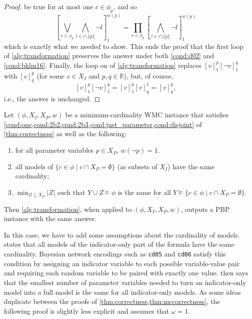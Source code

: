 \documentclass[runningheads]{llncs}
\begin{document}
\begin{proof}
   be true for at most one $c \in \phi_p$, and so
   \[
     \left[ \bigvee_{c \in \phi_p} \bigwedge_{l \in c \setminus \{ p \}} \neg l
     \right]_1^{w(p)} = \prod_{c \in \phi_p} \left[ \bigwedge_{l \in c \setminus
         \{ p \}} \neg l \right]_1^{w(p)}
   \]
   which is exactly what we needed to show. This ends the proof that the
   first loop of \cref{alg:transformation} preserves the answer under both
   \cref{cond:d02} and \cref{cond:bklm16}. Finally, the loop on
    of \cref{alg:transformation}
   replaces $[v]_1^p[\neg v]_1^q$ with $[v]_q^p$ (for some $v \in X_I$ and $p, q
   \in \mathbb{R}$), but, of course,
   \[
     [v]_1^p[\neg v]_1^q = [v]_1^p[v]_q^1 = [v]_q^p,
   \]
   i.e., the answer is unchanged.
\end{proof}

\begin{theorem} \label{thm:mccorrectness}
  Let $(\phi, X_I, X_P, w)$ be a minimum-cardinality WMC instance that satisfies
  \cref{cond:one,cond:2b2,cond:2b3,cond:just_parameter,cond:disjoint} of
  \cref{thm:correctness} as well as the following:
  \begin{enumerate}
  \item for all parameter variables $p \in X_P$, $w(\neg p) = 1$.
  \item all models of $\{ c \in \phi \mid c \cap X_P = \emptyset \}$ (as subsets
    of $X_I$) have the same cardinality; \label{cond:22}
  \item $\min_{Z \subseteq X_P} |Z|$ such that $Y \cup Z \models \phi$ is the
    same for all $Y \models \{ c \in \phi \mid c \cap X_P = \emptyset
    \}$. \label{cond:23}
  \end{enumerate}
  Then \cref{alg:transformation}, when applied to $(\phi, X_I, X_P, w)$, outputs
  a PBP instance with the same answer.
\end{theorem}

In this case, we have to add some assumptions about the cardinality of models.
 states that all models of the indicator-only part of the formula
have the same cardinality. Bayesian network encodings such as \texttt{cd05} and
\texttt{cd06} satisfy this condition by assigning an indicator variable to each
possible variable-value pair and requiring each random variable to be paired
with exactly one value.  then says that the smallest number of
parameter variables needed to turn an indicator-only model into a full model is
the same for all indicator-only models. As some ideas duplicate between the
proofs of \cref{thm:correctness,thm:mccorrectness}, the following proof is
slightly less explicit and assumes that $\omega = 1$.
\end{document}

